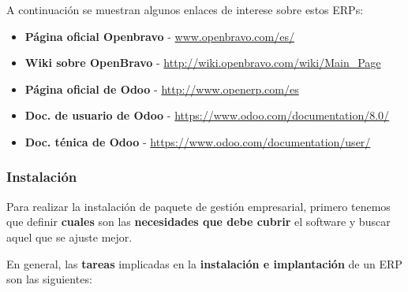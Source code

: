 A continuación se muestran algunos enlaces de interese sobre estos ERPs:

\begin{itemize}
    \item \textbf{Página oficial Openbravo} - \url{www.openbravo.com/es/}
    \item \textbf{Wiki sobre OpenBravo} - \url{http://wiki.openbravo.com/wiki/Main_Page}
    \item \textbf{Página oficial de Odoo} - \url{http://www.openerp.com/es}
    \item \textbf{Doc. de usuario de Odoo} - \url{https://www.odoo.com/documentation/8.0/}
    \item \textbf{Doc. ténica de Odoo} - \url{https://www.odoo.com/documentation/user/}
\end{itemize}

\subsubsection{Instalación}
Para realizar la instalación de paquete de gestión empresarial, primero tenemos que definir \textbf{cuales} son las \textbf{necesidades que debe cubrir} el software y buscar aquel que se ajuste mejor.

En general, las \textbf{tareas} implicadas en la \textbf{instalación e implantación} de un ERP son las siguientes:

